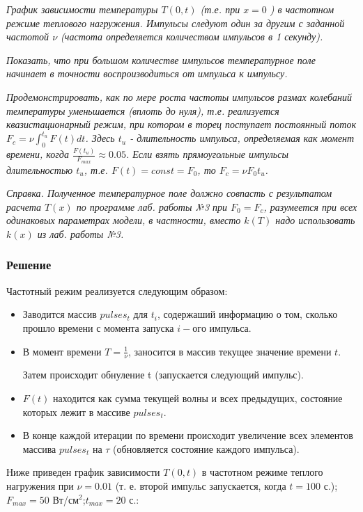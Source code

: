\documentclass[a4paper,12pt]{article}
\begin{document}
	\textit{График зависимости температуры $T(0, t)$ (т.е. при $x = 0$ ) в частотном режиме теплового нагружения. Импульсы следуют один за другим с заданной частотой $\nu$ (частота определяется количеством импульсов в 1 секунду).}
	
	\textit{Показать, что при большом количестве импульсов температурное поле начинает в точности воспроизводиться от импульса к импульсу.}
	
	\textit{Продемонстрировать, как по мере роста частоты импульсов размах колебаний температуры уменьшается (вплоть до нуля), т.е. реализуется квазистационарный режим, при котором в торец поступает постоянный поток $F_c = \nu \int_{0}^{t_u}F(t)dt$. Здесь $t_u$ - длительность импульса, определяемая как момент времени, когда $\frac{F(t_u)}{F_{max}} \approx 0.05$. Если взять прямоугольные импульсы длительностью $t_u$, т.е. $F(t) = const = F_0$, то $F_c = \nu F_0 t_u$.}
	
	\textit{Справка. Полученное температурное поле должно совпасть с результатом расчета $T(x)$ по программе лаб. работы №3 при $F_0 = F_c$, разумеется при всех одинаковых параметрах модели, в частности, вместо $k(T)$ надо использовать $k(x)$ из лаб. работы №3.}
	
	\subsubsection*{Решение}
	
	Частотный режим реализуется следующим образом:
	\begin{itemize}
		\item Заводится массив $pulses_t$ для $t_i$, содержаший информацию о том, сколько прошло времени с момента запуска $i-ого$ импульса.
		\item В момент времени $T = \frac{1}{\nu}$, заносится в массив текущее значение времени $t$.
		
		Затем происходит обнуление t (запускается следующий импульс).
		\item $F(t)$ находится как сумма текущей волны и всех предыдущих, состояние которых лежит в массиве $pulses_t$.
		\item В конце каждой итерации по времени происходит увеличение всех элементов массива $pulses_t$ на $\tau$ (обновляется состояние каждого импульса).
	\end{itemize}

	\newpage

	Ниже приведен график зависимости $T(0, t)$ в частотном режиме теплого нагружения при $\nu = 0.01$ (т. е. второй импульс запускается, когда $t = 100$ с.); $F_{max}=50$ Вт/см$^2$;$t_{max} = 20$ с.:
	
\end{document}
